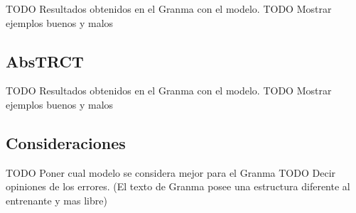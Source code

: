 TODO Resultados obtenidos en el Granma con el modelo.
TODO Mostrar ejemplos buenos y malos

\subsection{AbsTRCT}

TODO Resultados obtenidos en el Granma con el modelo.
TODO Mostrar ejemplos buenos y malos

\subsection{Consideraciones}

TODO Poner cual modelo se considera mejor para el Granma 
TODO Decir opiniones de los errores. (El texto de Granma posee una estructura diferente al entrenante y mas libre)
